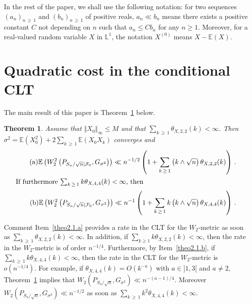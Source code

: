 \documentclass[10pt]{amsart}
\newtheorem{theo}{Theorem}[section]
\theoremstyle{definition}\newtheorem{defi}[theo]{Definition}\newtheorem{rema}[theo]{Remark}\newtheorem{exam}[theo]{Example}\newtheorem{exem}[theo]{Example}\newtheorem{nota}[theo]{Notation}
\newcommand{\bbE}{\mathbb{E}}
\newcommand{\clF}{\mathcal{F}}
\newcommand{\bbL}{\mathbb{L}}
\begin{document}

In the rest of the paper, we shall use the following notation: for two sequences $(a_n)_{n\,\geq\,1}$ and $(b_n)_{n\,\geq\,1}$ of positive reals, $a_n \ll b_n$ means there exists a positive constant $C$ not depending on $n$ such that $a_n \leq C b_n$ for any $n\geq 1$. Moreover, for a real-valued random variable $X$ in $\bbL^1$, the notation $X^{(0)}$ means $X - \bbE (X)$.



\section{Quadratic cost in the conditional CLT} \label{section2}

The main result of this paper is Theorem~\ref{thW2} below.


\begin{theo} \label{thW2}
Assume that $\Vert X_0 \Vert_{\infty} \leq M$ and that $\sum_{k\,\geq\,1} \theta_{X,2,2} (k) < \infty$. Then $\sigma^2 = \bbE (X_0^2) + 2 \sum_{k\,\geq\,1}\bbE (X_0X_k)$ converges and
\begin{align}
\tag{$\rm a$}\bbE \left(W_2^2 \left(P_{S_n / {\sqrt n} |\clF_0 }, G_{\sigma^2}\right) \right) \ll n^{-1/2} \left(1 + \sum_{k\,\geq\,1} \left(k \wedge \sqrt{n}\right) \theta_{X,2,2} (k) \right) \,.\label{theo2.1.a}
\\
\intertext{If furthermore $ \sum_{k\,\geq\,1} k \theta_{X,4,4} (k) < \infty$, then}
\tag{$\rm b$}\bbE \left(W_2^2 \left(P_{S_n / {\sqrt n} |\clF_0 }, G_{\sigma^2}\right) \right) \ll n^{-1} \left(1 + \sum_{k\,\geq\,1} k \left(k \wedge \sqrt{n}\right) \theta_{X,4,4} (k) \right)\,.\label{theo2.1.b}
\end{align}
\end{theo}


\begin{enonce}{Comment}\label{comm2.2}
Item~\eqref{theo2.1.a} provides a rate in the CLT for the $W_2$-metric as soon as $\sum_{k\,\geq\,1} \theta_{X,2,2} (k) < \infty$. In addition, if $ \sum_{k\geq 1} k \theta_{X,2,2} (k) < \infty$, then the rate in the $W_2$-metric is of order $n^{-1/4}$. Furthermore, by Item~\eqref{theo2.1.b}, if $ \sum_{k\,\geq\,1} k \theta_{X,4,4} (k) < \infty$, then the rate in the CLT for the $W_2$-metric is $o (n^{-1/4})$. For example, if $\theta_{X,4,4} (k) = O (k^{-a}) $ with $ a \in]1,3[$ and $a \neq 2$, Theorem~\ref{thW2} implies that $W_2 (P_{S_n / {\sqrt n} }, G_{\sigma^2}) \ll n^{-(a-1)/4} $. Moreover $ W_2 (P_{S_n / {\sqrt n} }, G_{\sigma^2}) \ll n^{-1/2}$ as soon as $ \sum_{k\,\geq\,1} k^2 \theta_{X,4,4} (k) < \infty$.
\end{enonce}
\end{document}
